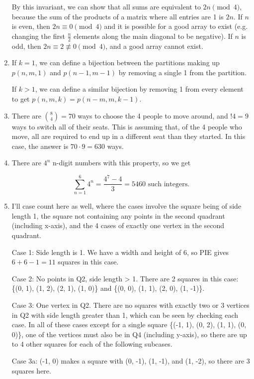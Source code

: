 \documentclass{book}
\numberwithin{equation}{section}
\begin{document}
\begin{enumerate}[label={9.\arabic*}]
By this invariant, we can show that all sums are equivalent to $2n \pmod{4}$, because the sum of the
products of a matrix where all entries are 1 is $2n$. If $n$ is even, then $2n \equiv 0 \pmod{4}$ and it is possible
for a good array to exist (e.g. changing the first $\frac{n}{2}$ elements along the main diagonal to be negative).
If $n$ is odd, then $2n \equiv 2 \not\equiv 0 \pmod{4}$, and a good array cannot exist.

\item
If $k=1$, we can define a bijection between the partitions making up $p(n, m, 1)$ and $p(n-1, m-1)$ by removing
a single 1 from the partition.

If $k > 1$, we can define a similar bijection by removing 1 from every element to get $p(n, m, k) = p(n-m, m, k-1)$.

\item
There are ${8 \choose 4} = 70$ ways to choose the 4 people to move around, and $!4 = 9$ ways to switch all of their
seats. This is assuming that, of the 4 people who move, all are required to end up in a different seat than they started.
In this case, the answer is $70 \cdot 9 = 630$ ways.

\item
There are $4^n$ n-digit numbers with this property, so we get

$$\sum_{n=1}^6 4^n = \frac{4^7 - 4}{3} = 5460 \text{ such integers.}$$

\item
I'll case count here as well, where the cases involve the square being of side length 1, the square not containing any
points in the second quadrant (including x-axis), and the 4 cases of exactly one vertex in the second quadrant.

Case 1: Side length is 1. We have a width and height of 6, so PIE gives $6+6-1 = 11$ squares in this case.

Case 2: No points in Q2, side length > 1. There are 2 squares in this case: \{(0, 1), (1, 2), (2, 1), (1, 0)\} and
\{(0, 0), (1, 1), (2, 0), (1, -1)\}.

Case 3: One vertex in Q2. There are no squares with exactly two or 3 vertices in Q2 with side length greater than 1,
which can be seen by checking each case. In all of these cases except for a single square \{(-1, 1), (0, 2), (1, 1), (0, 0)\},
one of the vertices must also be in Q4 (including y-axis), so there are up to 4 other squares for each of the following
subcases.

Case 3a: (-1, 0) makes a square with (0, -1), (1, -1), and (1, -2), so there are 3 squares here.


\end{enumerate}
\end{document}

